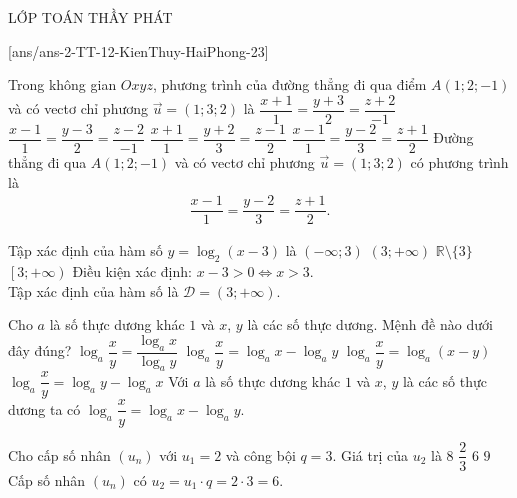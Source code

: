 \begin{name}
	{\tenchude}{\tendethi}{LỚP TOÁN THẦY PHÁT}{\thoigian}
\end{name}
\setcounter{ex}{0}\setcounter{bt}{0}
[ans/ans-2-TT-12-KienThuy-HaiPhong-23]

\begin{ex}%
	Trong không gian $Oxyz$, phương trình của đường thẳng đi qua điểm $A(1;2;-1)$ và có vectơ chỉ phương $\overrightarrow{u}=(1;3;2)$ là
	\choice
	{$\dfrac{x+1}{1}=\dfrac{y+3}{2}=\dfrac{z+2}{-1}$}
	{$\dfrac{x-1}{1}=\dfrac{y-3}{2}=\dfrac{z-2}{-1}$}
	{$\dfrac{x+1}{1}=\dfrac{y+2}{3}=\dfrac{z-1}{2}$}
	{\True $\dfrac{x-1}{1}=\dfrac{y-2}{3}=\dfrac{z+1}{2}$}
	\loigiai
	{
		Đường thẳng đi qua $A(1;2;-1)$ và có vectơ chỉ phương $\overrightarrow{u}=(1;3;2)$ có phương trình là
		\begin{align*}
			\dfrac{x-1}{1}=\dfrac{y-2}{3}=\dfrac{z+1}{2}.
		\end{align*}	
	}
\end{ex}

\begin{ex}%
	Tập xác định của hàm số $y=\log_2 (x-3)$ là
	\choice
	{$(-\infty;3)$}
	{\True $(3;+\infty)$}
	{$\mathbb{R}\setminus \{3\}$}
	{$\left[3;+\infty\right)$}
	\loigiai
	{
		Điều kiện xác định: $x-3>0\Leftrightarrow x>3$.\\
		Tập xác định của hàm số là $\mathscr{D}=(3;+\infty)$.
	}
\end{ex}

\begin{ex}%
	Cho $a$ là số thực dương khác $1$ và $x$, $y$ là các số thực dương. Mệnh đề nào dưới đây đúng?
	\choice
	{$\log_a \dfrac{x}{y}=\dfrac{\log_a x}{\log_a y}$}
	{\True $\log_a \dfrac{x}{y}=\log_a x-\log_a y$}
	{$\log_a \dfrac{x}{y}=\log_a (x-y)$}
	{$\log_a \dfrac{x}{y}=\log_a y-\log_a x$}
	\loigiai
	{
		Với $a$ là số thực dương khác $1$ và $x$, $y$ là các số thực dương ta có $\log_a \dfrac{x}{y}=\log_a x-\log_a y$.
	}
\end{ex}

\begin{ex}%
	Cho cấp số nhân $(u_n)$ với $u_1=2$ và công bội $q=3$. Giá trị của $u_2$ là
	\choice
	{$8$}
	{$\dfrac{2}{3}$}
	{\True $6$}
	{$9$}
	\loigiai
	{
		Cấp số nhân $(u_n)$ có $u_2=u_1\cdot q=2\cdot 3=6$.	
	}
\end{ex}

